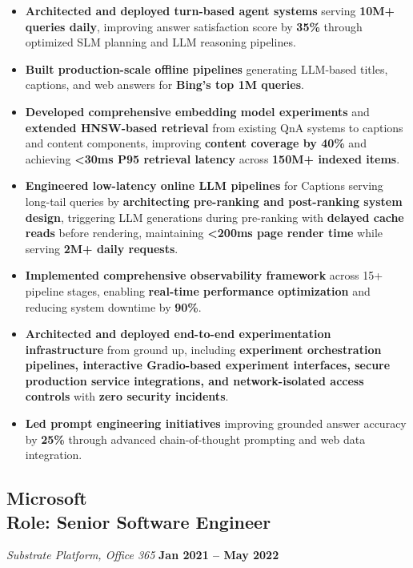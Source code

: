 \documentclass[11pt,letterpaper]{article}
\begin{document}
\begin{itemize}[leftmargin=*,noitemsep]
    \item \textbf{Architected and deployed turn-based agent systems} serving \textbf{10M+ queries daily}, improving answer satisfaction score by \textbf{35\%} through optimized SLM planning and LLM reasoning pipelines.
    \item \textbf{Built production-scale offline pipelines} generating LLM-based titles, captions, and web answers for \textbf{Bing's top 1M queries}.
    \item \textbf{Developed comprehensive embedding model experiments} and \textbf{extended HNSW-based retrieval} from existing QnA systems to captions and content components, improving \textbf{content coverage by 40\%} and achieving \textbf{<30ms P95 retrieval latency} across \textbf{150M+ indexed items}.
    \item \textbf{Engineered low-latency online LLM pipelines} for Captions serving long-tail queries by \textbf{architecting pre-ranking and post-ranking system design}, triggering LLM generations during pre-ranking with \textbf{delayed cache reads} before rendering, maintaining \textbf{<200ms page render time} while serving \textbf{2M+ daily requests}.
    \item \textbf{Implemented comprehensive observability framework} across 15+ pipeline stages, enabling \textbf{real-time performance optimization} and reducing system downtime by \textbf{90\%}.
    \item \textbf{Architected and deployed end-to-end experimentation infrastructure} from ground up, including \textbf{experiment orchestration pipelines, interactive Gradio-based experiment interfaces, secure production service integrations, and network-isolated access controls} with \textbf{zero security incidents}.
    \item \textbf{Led prompt engineering initiatives} improving grounded answer accuracy by \textbf{25\%} through advanced chain-of-thought prompting and web data integration.
\end{itemize}

\subsection{Microsoft \\ Role: Senior Software Engineer}
\textit{Substrate Platform, Office 365} \hfill \textbf{Jan 2021 -- May 2022}
\end{document}
